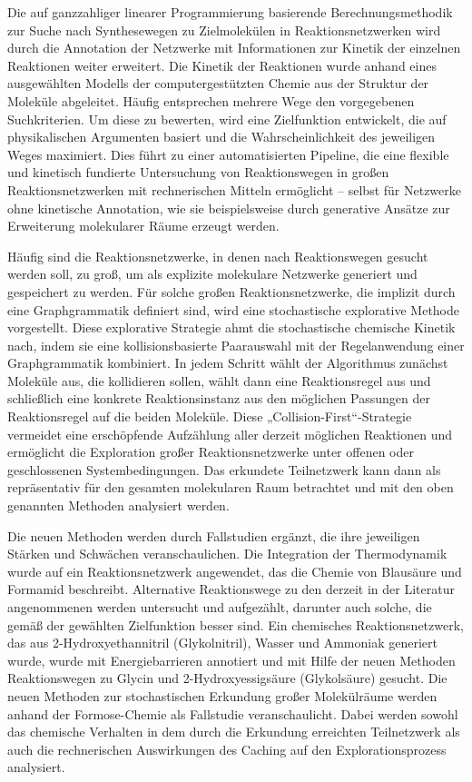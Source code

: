 Die auf ganzzahliger linearer Programmierung basierende Berechnungsmethodik zur Suche nach Synthesewegen zu Zielmolekülen in Reaktionsnetzwerken wird durch die Annotation der Netzwerke mit Informationen zur Kinetik der einzelnen Reaktionen weiter erweitert. 
Die Kinetik der Reaktionen wurde anhand eines ausgewählten Modells der computergestützten Chemie aus der Struktur der Moleküle abgeleitet.
Häufig entsprechen mehrere Wege den vorgegebenen Suchkriterien. Um diese zu bewerten, wird eine Zielfunktion entwickelt, die auf physikalischen Argumenten basiert und die Wahrscheinlichkeit des jeweiligen Weges maximiert. Dies führt zu einer automatisierten Pipeline, die eine flexible und kinetisch fundierte Untersuchung von Reaktionswegen in großen Reaktionsnetzwerken mit rechnerischen Mitteln ermöglicht – selbst für Netzwerke ohne kinetische Annotation, wie sie beispielsweise durch generative Ansätze zur Erweiterung molekularer Räume erzeugt werden. 

Häufig sind die Reaktionsnetzwerke, in denen nach Reaktionswegen gesucht werden soll, zu groß, um als explizite molekulare Netzwerke generiert und gespeichert zu werden. Für solche großen Reaktionsnetzwerke, die implizit durch eine Graphgrammatik definiert sind, wird eine stochastische explorative Methode vorgestellt. Diese explorative Strategie  ahmt die stochastische chemische Kinetik nach, indem sie eine kollisionsbasierte Paarauswahl mit der Regelanwendung einer Graphgrammatik kombiniert. In jedem Schritt wählt der Algorithmus zunächst Moleküle aus, die kollidieren sollen, wählt dann eine Reaktionsregel aus und schließlich eine konkrete Reaktionsinstanz aus den möglichen Passungen der Reaktionsregel auf die beiden Moleküle. Diese „Collision-First“-Strategie vermeidet eine erschöpfende Aufzählung aller derzeit möglichen Reaktionen und ermöglicht die Exploration großer Reaktionsnetzwerke unter offenen oder geschlossenen Systembedingungen. Das erkundete Teilnetzwerk kann dann als repräsentativ für den gesamten molekularen Raum betrachtet und mit den oben genannten Methoden analysiert werden. 

Die neuen Methoden werden durch Fallstudien ergänzt, die ihre jeweiligen Stärken und Schwächen veranschaulichen. 
Die Integration der Thermodynamik wurde auf ein Reaktionsnetzwerk angewendet, das die Chemie von Blausäure und Formamid beschreibt. Alternative Reaktionswege zu den derzeit in der Literatur angenommenen werden untersucht und aufgezählt, darunter auch solche, die gemäß der gewählten Zielfunktion besser sind. 
Ein chemisches Reaktionsnetzwerk, das aus 2-Hydroxyethannitril (Glykolnitril), Wasser und Ammoniak generiert wurde, wurde mit Energiebarrieren annotiert und mit Hilfe der neuen Methoden Reaktionswegen zu Glycin und 2-Hydroxyessigsäure (Glykolsäure) gesucht.
Die neuen Methoden zur stochastischen Erkundung großer Molekülräume werden anhand der Formose-Chemie als Fallstudie veranschaulicht. Dabei werden sowohl das chemische Verhalten in dem durch die Erkundung erreichten Teilnetzwerk als auch die rechnerischen Auswirkungen des Caching auf den Explorationsprozess analysiert.

